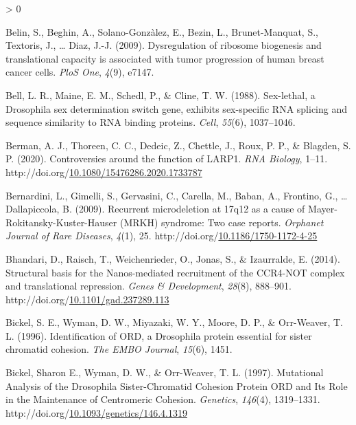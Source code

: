 \documentclass[12pt,oneside]{reedthesis}
\newlength{\cslhangindent}
\newenvironment{CSLReferences}[2] %
 {%
  \setlength{\parindent}{0pt}
  \ifodd #1 \everypar{\setlength{\hangindent}{\cslhangindent}}\ignorespaces\fi
  \ifnum #2 > 0
  \setlength{\parskip}{#2\baselineskip}
  \fi
 }%
 {}
\begin{document}
\begin{CSLReferences}{1}{0}
\leavevmode\hypertarget{ref-Belin2009a}{}%
Belin, S., Beghin, A., Solano-Gonzàlez, E., Bezin, L., Brunet-Manquat, S., Textoris, J., \ldots{} Diaz, J.-J. (2009). Dysregulation of ribosome biogenesis and translational capacity is associated with tumor progression of human breast cancer cells. \emph{PloS One}, \emph{4}(9), e7147.

\leavevmode\hypertarget{ref-Bell1988}{}%
Bell, L. R., Maine, E. M., Schedl, P., \& Cline, T. W. (1988). Sex-lethal, a {Drosophila} sex determination switch gene, exhibits sex-specific {RNA} splicing and sequence similarity to {RNA} binding proteins. \emph{Cell}, \emph{55}(6), 1037--1046.

\leavevmode\hypertarget{ref-bermanControversiesFunctionLARP12020}{}%
Berman, A. J., Thoreen, C. C., Dedeic, Z., Chettle, J., Roux, P. P., \& Blagden, S. P. (2020). Controversies around the function of {LARP1}. \emph{RNA Biology}, 1--11. http://doi.org/\href{https://doi.org/10.1080/15476286.2020.1733787}{10.1080/15476286.2020.1733787}

\leavevmode\hypertarget{ref-bernardiniRecurrentMicrodeletion17q122009}{}%
Bernardini, L., Gimelli, S., Gervasini, C., Carella, M., Baban, A., Frontino, G., \ldots{} Dallapiccola, B. (2009). Recurrent microdeletion at 17q12 as a cause of {Mayer-Rokitansky-Kuster-Hauser} ({MRKH}) syndrome: Two case reports. \emph{Orphanet Journal of Rare Diseases}, \emph{4}(1), 25. http://doi.org/\href{https://doi.org/10.1186/1750-1172-4-25}{10.1186/1750-1172-4-25}

\leavevmode\hypertarget{ref-Bhandari2014h}{}%
Bhandari, D., Raisch, T., Weichenrieder, O., Jonas, S., \& Izaurralde, E. (2014). Structural basis for the {Nanos-mediated} recruitment of the {CCR4-NOT} complex and translational repression. \emph{Genes \& Development}, \emph{28}(8), 888--901. http://doi.org/\href{https://doi.org/10.1101/gad.237289.113}{10.1101/gad.237289.113}

\leavevmode\hypertarget{ref-bickelIdentificationORDDrosophila1996}{}%
Bickel, S. E., Wyman, D. W., Miyazaki, W. Y., Moore, D. P., \& Orr-Weaver, T. L. (1996). Identification of {ORD}, a {Drosophila} protein essential for sister chromatid cohesion. \emph{The EMBO Journal}, \emph{15}(6), 1451.

\leavevmode\hypertarget{ref-bickelMutationalAnalysisDrosophila1997}{}%
Bickel, Sharon E., Wyman, D. W., \& Orr-Weaver, T. L. (1997). Mutational {Analysis} of the {Drosophila Sister-Chromatid Cohesion Protein ORD} and {Its Role} in the {Maintenance} of {Centromeric Cohesion}. \emph{Genetics}, \emph{146}(4), 1319--1331. http://doi.org/\href{https://doi.org/10.1093/genetics/146.4.1319}{10.1093/genetics/146.4.1319}


\end{CSLReferences}
\end{document}
